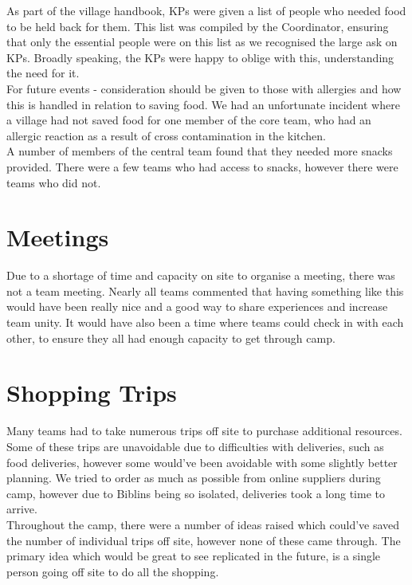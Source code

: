 As part of the village handbook, KPs were given a list of people who needed food to be held back for them. This list was compiled by the Coordinator, ensuring that only the essential people were on this list as we recognised the large ask on KPs. Broadly speaking, the KPs were happy to oblige with this, understanding the need for it. \\

For future events - consideration should be given to those with allergies and how this is handled in relation to saving food. We had an unfortunate incident where a village had not saved food for one member of the core team, who had an allergic reaction as a result of cross contamination in the kitchen. \\

A number of members of the central team found that they needed more snacks provided. There were a few teams who had access to snacks, however there were teams who did not.

\section{Meetings}
Due to a shortage of time and capacity on site to organise a meeting, there was not a team meeting. Nearly all teams commented that having something like this would have been really nice and a good way to share experiences and increase team unity. It would have also been a time where teams could check in with each other, to ensure they all had enough capacity to get through camp.

\section{Shopping Trips}
Many teams had to take numerous trips off site to purchase additional resources. Some of these trips are unavoidable due to difficulties with deliveries, such as food deliveries, however some would've been avoidable with some slightly better planning. We tried to order as much as possible from online suppliers during camp, however due to Biblins being so isolated, deliveries took a long time to arrive. \\

Throughout the camp, there were a number of ideas raised which could've saved the number of individual trips off site, however none of these came through. The primary idea which would be great to see replicated in the future, is a single person going off site to do all the shopping. 
